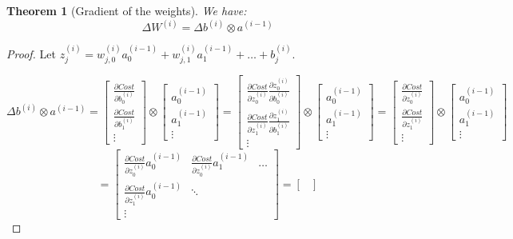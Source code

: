 \documentclass{article}
\newtheorem{theorem}{Theorem}[section]
\theoremstyle{definition}
\theoremstyle{remark}
\theoremstyle{example}
\begin{document}
\begin{theorem}[Gradient of the weights]
    We have:
        $$\Delta W^{(i)} = \Delta b^{(i)} \otimes a^{(i-1)}$$
\end{theorem}

\begin{proof}
    Let $z^{(i)}_j = w_{j,0}^{(i)} a_0^{(i-1)} + w_{j,1}^{(i)} a_1^{(i-1)} + \dots + b_j^{(i)}$.

$$\Delta b^{(i)} \otimes a^{(i-1)}
=
\begin{bmatrix}
    \frac{\partial Cost}{\partial b_0^{(i)}}\\
    \frac{\partial Cost}{\partial b_1^{(i)}}\\
    \vdots
\end{bmatrix}
\otimes
\begin{bmatrix}
    a_0^{(i-1)}\\
    a_1^{(i-1)}\\
    \vdots
\end{bmatrix}
= \begin{bmatrix}
    \frac{\partial Cost}{\partial z^{(i)}_0} \frac{\partial z^{(i)}_0}{\partial b_0^{(i)}}\\
    \frac{\partial Cost}{\partial z^{(i)}_1} \frac{\partial z^{(i)}_1}{\partial b_1^{(i)}}\\
    \vdots
\end{bmatrix}
\otimes
\begin{bmatrix}
    a_0^{(i-1)}\\
    a_1^{(i-1)}\\
    \vdots
\end{bmatrix}
= \begin{bmatrix}
    \frac{\partial Cost}{\partial z^{(i)}_0}\\
    \frac{\partial Cost}{\partial z^{(i)}_1}\\
    \vdots
\end{bmatrix}
\otimes
\begin{bmatrix}
    a_0^{(i-1)}\\
    a_1^{(i-1)}\\
    \vdots
\end{bmatrix}$$
$$=\begin{bmatrix}
    \frac{\partial Cost}{\partial z^{(i)}_0} a_0^{(i-1)} & \frac{\partial Cost}{\partial z^{(i)}_0} a_1^{(i-1)} & \dots\\
    \frac{\partial Cost}{\partial z^{(i)}_1} a_0^{(i-1)} & \ddots\\
    \vdots
\end{bmatrix}
=\begin{bmatrix}

\end{bmatrix}$$
\end{proof}
\end{document}
